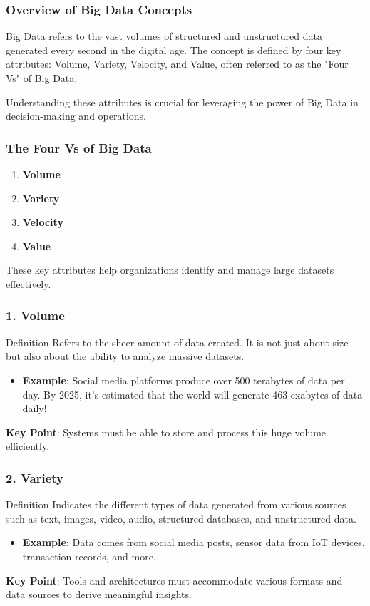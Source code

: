 \documentclass[aspectratio=169]{beamer}
\begin{document}
\begin{frame}[fragile]
    \frametitle{Overview of Big Data Concepts}
    Big Data refers to the vast volumes of structured and unstructured data generated every second in the digital age. 
    The concept is defined by four key attributes: Volume, Variety, Velocity, and Value, often referred to as the "Four Vs" of Big Data.
    
    Understanding these attributes is crucial for leveraging the power of Big Data in decision-making and operations.
\end{frame}

\begin{frame}[fragile]
    \frametitle{The Four Vs of Big Data}
    \begin{enumerate}
        \item \textbf{Volume}
        \item \textbf{Variety}
        \item \textbf{Velocity}
        \item \textbf{Value}
    \end{enumerate}
    These key attributes help organizations identify and manage large datasets effectively.
\end{frame}

\begin{frame}[fragile]
    \frametitle{1. Volume}
    \begin{block}{Definition}
        Refers to the sheer amount of data created. It is not just about size but also about the ability to analyze massive datasets.
    \end{block}
    \begin{itemize}
        \item \textbf{Example}: Social media platforms produce over 500 terabytes of data per day. By 2025, it’s estimated that the world will generate 463 exabytes of data daily!
    \end{itemize}
    \textbf{Key Point}: Systems must be able to store and process this huge volume efficiently.
\end{frame}

\begin{frame}[fragile]
    \frametitle{2. Variety}
    \begin{block}{Definition}
        Indicates the different types of data generated from various sources such as text, images, video, audio, structured databases, and unstructured data.
    \end{block}
    \begin{itemize}
        \item \textbf{Example}: Data comes from social media posts, sensor data from IoT devices, transaction records, and more.
    \end{itemize}
    \textbf{Key Point}: Tools and architectures must accommodate various formats and data sources to derive meaningful insights.
\end{frame}
\end{document}
